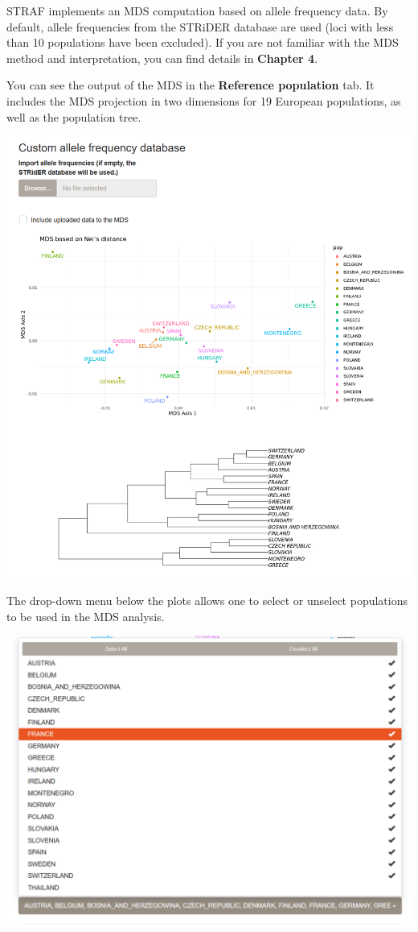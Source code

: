 \documentclass[
]{book}
\begin{document}
STRAF implements an MDS computation based on allele frequency data. By default,
allele frequencies from the STRiDER database \citep{ref_strider} are used (loci with less than 10
populations have been excluded). If you are not familiar with the MDS method and
interpretation, you can find details in \textbf{Chapter 4}.

You can see the output of the MDS in the \textbf{Reference population} tab. It includes the
MDS projection in two dimensions for 19 European populations, as well as the population
tree.

\includegraphics[width=1\linewidth]{img/capture_ref_pop_1}

The drop-down menu below the plots allows one to select or unselect populations
to be used in the MDS analysis.

\includegraphics[width=1\linewidth]{img/capture_ref_pop_2}
\end{document}

